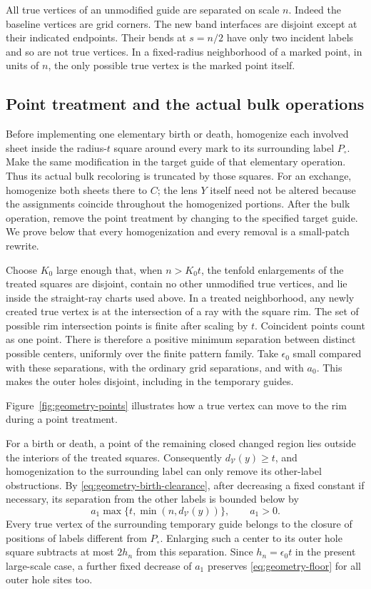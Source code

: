 All true vertices of an unmodified guide are separated on scale $n$.
Indeed the baseline vertices are grid corners.  The new band interfaces
are disjoint except at their indicated endpoints.  Their bends at
$s=n/2$ have only two incident labels and so are not true vertices.
In a fixed-radius neighborhood of a marked point, in units of $n$,
the only possible true vertex is the marked point itself.

\subsection{Point treatment and the actual bulk operations}

Before implementing one elementary birth or death, homogenize each
involved sheet inside the radius-$t$ square around every mark to its
surrounding label $P_\circ$.  Make the same modification in the target
guide of that elementary operation.  Thus its actual bulk recoloring
is truncated by those squares.  For an exchange, homogenize both
sheets there to $C$; the lens $Y$ itself need not be altered because
the assignments coincide throughout the homogenized portions.  After
the bulk operation, remove the point treatment by changing to the
specified target guide.  We prove below that every homogenization and
every removal is a small-patch rewrite.

Choose $K_0$ large enough that, when $n>K_0t$, the tenfold enlargements
of the treated squares are disjoint, contain no other unmodified true
vertices, and lie inside the straight-ray charts used above.  In a
treated neighborhood, any newly created true vertex is at the
intersection of a ray with the square rim.  The set of possible rim
intersection points is finite after scaling by $t$.  Coincident
points count as one point.  There is therefore a positive minimum
separation between distinct possible centers, uniformly over the
finite pattern family.  Take $\epsilon_0$ small compared with these
separations, with the ordinary grid separations, and with $a_0$.
This makes the outer holes disjoint, including in the temporary guides.

Figure~\ref{fig:geometry-points} illustrates how a true vertex can
move to the rim during a point treatment.


For a birth or death, a point of the remaining closed changed region
lies outside the interiors of the treated squares.  Consequently
$d_{\mathcal V}(y)\ge t$, and homogenization to the surrounding label
can only remove its other-label obstructions.  By
\eqref{eq:geometry-birth-clearance}, after decreasing a fixed constant
if necessary, its separation from the other labels is bounded below by
\begin{equation}
 a_1\max\{t,\min(n,d_{\mathcal V}(y))\},
 \qquad a_1>0.
 \label{eq:geometry-floor}
\end{equation}
Every true vertex of the surrounding temporary guide belongs to the
closure of positions of labels different from $P_\circ$.  Enlarging
such a center to its outer hole square subtracts at most $2h_n$ from
this separation.  Since $h_n=\epsilon_0t$ in the present large-scale
case, a further fixed decrease of $a_1$ preserves
\eqref{eq:geometry-floor} for all outer hole sites too.


